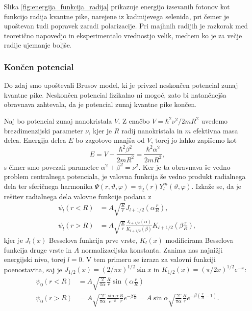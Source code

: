 \documentclass[twoside,11pt]{article}
\begin{document}
Slika \ref{fig:energija_funkcija_radija} prikazuje energijo izsevanih fotonov kot funkcijo radija kvantne pike, narejene iz kadmijevega selenida, pri čemer je upoštevan tudi popravek zaradi polarizacije. Pri majhnih radijih je razkorak med teoretično napovedjo
in eksperimentalo vrednostjo velik, medtem ko je za večje radije ujemanje boljše.

\subsubsection{Končen potencial}
Do zdaj smo upoštevali Brusov model, ki je privzel neskončen potencial zunaj kvantne pike. Neskončen potencial fizikalno ni mogoč, zato bi natančnejša obravnava 
zahtevala, da je potencial zunaj kvantne pike končen.

Naj bo potencial zunaj nanokristala $V$. Z enačbo $V = \hbar^2 \nu^2 / 2mR^2$ uvedemo brezdimenzijski parameter $\nu$, kjer je $R$ radij nanokristala in $m$ efektivna masa delca. Energija delca $E$ bo zagotovo manjša od $V$, torej
jo lahko zapišemo kot
\begin{equation}
   \label{eq:E_finite_barrier}
   E = V - \frac{\hbar^2 \beta^2}{2mR^2} = \frac{\hbar^2 \alpha^2}{2mR^2},
\end{equation}
s čimer smo povezali parametre $\alpha^2 + \beta^2 = \nu^2$. Ker je ta obravnava še vedno problem centralnega potenciala, je valovna funkcija še vedno
produkt radialnega dela ter sferičnega harmonika $\varPsi(r, \vartheta, \varphi) = \psi_l(r) Y_l^m(\vartheta, \varphi)$. Izkaže se, da je rešitev radialnega dela valovne funkcije podana z \cite{LEYRONAS2001631}
\begin{equation}
   \begin{split}
      \psi_l(r < R) &= A\sqrt{\frac{R}{r}}J_{l+1/2}\left(\alpha \frac{r}{R}\right), \\
      \psi_l(r > R) &= A\sqrt{\frac{R}{r}}\frac{J_{l+1/2}(\alpha)}{K_{l+1/2}(\beta)}  K_{l+1/2}\left(\beta \frac{r}{R}\right),
   \end{split}
\end{equation} 
kjer je $J_l(x)$ Besselova funkcija prve vrste, $K_l(x)$ modificirana Besselova funkcija druge vrste in $A$ normalizacijska konstanta. Zanima nas najnižji energijski nivo, torej $l=0$. V tem primeru
se izraza za valovni funkciji poenostavita, saj je $J_{1/2}(x)=(2/\pi x)^{1/2} \sin x$ in $K_{1/2}(x)=(\pi/2x)^{1/2}e^{-x}$:
\begin{equation}
   \label{eq:valovna_finite}
   \begin{split}
      \psi_0(r < R) &= A\sqrt{\frac{2}{\pi \alpha}} \frac{R}{r} \sin \left(\alpha \frac{r}{R}\right) \\
      \psi_0(r > R) &= A\sqrt{\frac{2}{\pi \alpha}} \frac{\sin \alpha}{e^{-\beta}} \frac{R}{r} e^{-\beta \frac{r}{R}} = A\sin \alpha \sqrt{\frac{2}{\pi \alpha}} \frac{R}{r} e^{-\beta \left(\frac{r}{R} - 1\right)}.
   \end{split}
\end{equation}
\end{document}
